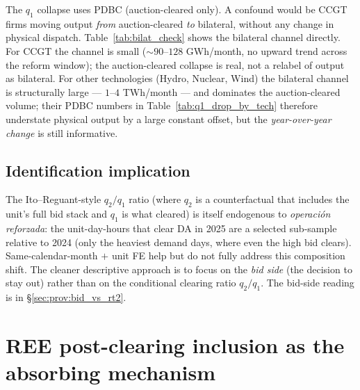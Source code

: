 \documentclass[11pt,a4paper]{article}
\begin{document}
The $q_1$ collapse uses PDBC (auction-cleared only). A confound would be CCGT firms moving output \emph{from} auction-cleared \emph{to} bilateral, without any change in physical dispatch. Table~\ref{tab:bilat_check} shows the bilateral channel directly. For CCGT the channel is small ($\sim 90$--$128$ GWh/month, no upward trend across the reform window); the auction-cleared collapse is real, not a relabel of output as bilateral. For other technologies (Hydro, Nuclear, Wind) the bilateral channel is structurally large --- $1$--$4$ TWh/month --- and dominates the auction-cleared volume; their PDBC numbers in Table~\ref{tab:q1_drop_by_tech} therefore understate physical output by a large constant offset, but the \emph{year-over-year change} is still informative.

\begin{table}[H]
\centering
\caption{\textbf{Bilateral channel by technology and regime, GWh / month.} \textbf{Programs: PDBF $-$ PDBC} (bilateral-contract executions reported by BRPs and folded into PDBF). Pivotal-firm aggregate. CCGT bilaterals are small and roughly stable; Hydro/Nuclear/Wind bilaterals are an order of magnitude larger and structurally part of their dispatch.}
\label{tab:bilat_check}
\setlength{\tabcolsep}{4pt}

\end{table}

\subsection{Identification implication}\label{sec:prov:q1_drop:ident}

The Ito--Reguant-style $q_2/q_1$ ratio (where $q_2$ is a counterfactual that includes the unit's full bid stack and $q_1$ is what cleared) is itself endogenous to \emph{operación reforzada}: the unit-day-hours that clear DA in 2025 are a selected sub-sample relative to 2024 (only the heaviest demand days, where even the high bid clears). Same-calendar-month $+$ unit FE help but do not fully address this composition shift. The cleaner descriptive approach is to focus on the \emph{bid side} (the decision to stay out) rather than on the conditional clearing ratio $q_2 / q_1$. The bid-side reading is in \S\ref{sec:prov:bid_vs_rt2}.


\section{REE post-clearing inclusion as the absorbing mechanism}\label{sec:prov:phf_minus_pdbf}
\end{document}
